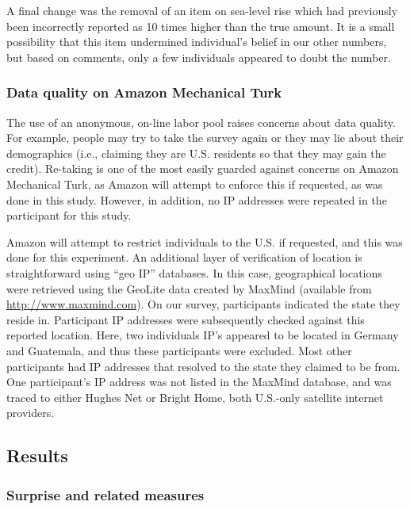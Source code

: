 A final change was the removal of an item on sea-level rise which had previously
been incorrectly reported as 10 times higher than the true amount. It is a small
possibility that this item undermined individual's belief in our other numbers,
but based on comments, only a few individuals appeared to doubt the number.

\subsubsection{Data quality on Amazon Mechanical Turk}
\label{sec:mturk-problems}

The use of an anonymous, on-line labor pool raises concerns about data quality.
For example, people may try to take the survey again or they may lie about their
demographics (i.e., claiming they are U.S. residents so that they may gain the
credit). Re-taking is one of the most easily guarded against concerns on Amazon
Mechanical Turk, as Amazon will attempt to enforce this if requested, as was
done in this study. However, in addition, no IP addresses were repeated in the
participant for this study.

Amazon will attempt to restrict individuals to the U.S. if requested, and this
was done for this experiment. An additional layer of verification of location is
straightforward using “geo IP” databases. In this case, geographical locations
were retrieved using the GeoLite data created by MaxMind (available from
\url{http://www.maxmind.com}). On our survey, participants indicated the state
they reside in. Participant IP addresses were subsequently checked against this
reported location. Here, two individuals IP’s appeared to be located in Germany
and Guatemala, and thus these participants were excluded. Most other
participants had IP addresses that resolved to the state they claimed to be
from. One participant’s IP address was not listed in the MaxMind database, and
was traced to either Hughes Net or Bright Home, both U.S.-only satellite
internet providers.

\subsection{Results}

\subsubsection{Surprise and related measures}


